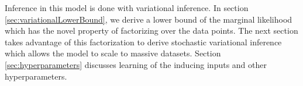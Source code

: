%
%

Inference in this model is done with variational inference.
In section \ref{sec:variationalLowerBound}, we derive a lower bound of the marginal likelihood which has the novel property of factorizing over the data points.
The next section takes advantage of this factorization to derive stochastic variational inference which allows the model to scale to massive datasets.
Section \ref{sec:hyperparameters} discusses learning of the inducing inputs and other hyperparameters.

